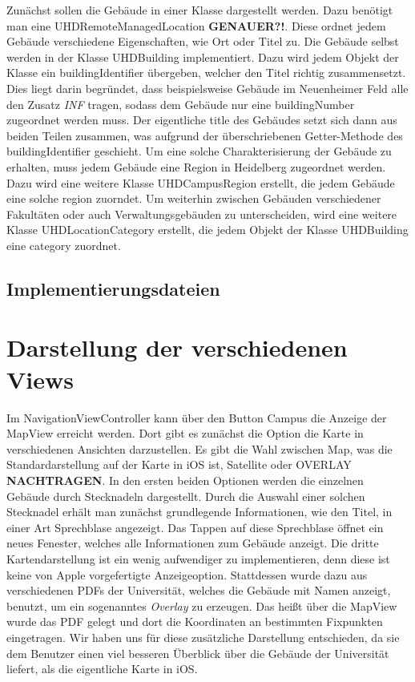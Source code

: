 \documentclass{scrreprt}
\begin{document}
Zunächst sollen die Gebäude in einer Klasse dargestellt werden. Dazu benötigt man eine \textsf{UHDRemoteManagedLocation} \textbf{GENAUER?!}. Diese ordnet jedem Gebäude verschiedene Eigenschaften, wie Ort oder Titel zu. Die Gebäude selbst werden in der Klasse \textsf{UHDBuilding} implementiert. Dazu wird jedem Objekt der Klasse ein \textsf{buildingIdentifier} übergeben, welcher den Titel richtig zusammensetzt. Dies liegt darin begründet, dass beispielsweise Gebäude im Neuenheimer Feld alle den Zusatz \emph{INF} tragen, sodass dem Gebäude nur eine \textsf{buildingNumber} zugeordnet werden muss. Der eigentliche \textsf{title} des Gebäudes setzt sich dann aus beiden Teilen zusammen, was aufgrund der überschriebenen Getter-Methode des \textsf{buildingIdentifier} geschieht. Um eine solche Charakterisierung der Gebäude zu erhalten, muss jedem Gebäude eine Region in Heidelberg zugeordnet werden. Dazu wird eine weitere Klasse \textsf{UHDCampusRegion} erstellt, die jedem Gebäude eine solche \textsf{region} zuorndet. Um weiterhin zwischen Gebäuden verschiedener Fakultäten oder auch Verwaltungsgebäuden zu unterscheiden, wird eine weitere Klasse \textsf{UHDLocationCategory} erstellt, die jedem Objekt der Klasse \textsf{UHDBuilding} eine \textsf{category} zuordnet.

\subsection{Implementierungsdateien}

\begin{objclst}

\end{objclst}


\section{Darstellung der verschiedenen Views}

Im \textsf{NavigationViewController} kann über den Button \textsf{Campus} die Anzeige der \textsf{MapView} erreicht werden. Dort gibt es zunächst die Option die Karte in verschiedenen Ansichten darzustellen. Es gibt die Wahl zwischen \textsf{Map}, was die Standardarstellung auf der Karte in iOS ist, \textsf{Satellite} oder \textsf{OVERLAY} \textbf{NACHTRAGEN}. In den ersten beiden Optionen werden die einzelnen Gebäude durch Stecknadeln dargestellt. Durch die Auswahl einer solchen Stecknadel erhält man zunächst grundlegende Informationen, wie den Titel, in einer Art Sprechblase angezeigt. Das Tappen auf diese Sprechblase öffnet ein neues Fenester, welches alle Informationen zum Gebäude anzeigt. Die dritte Kartendarstellung ist ein wenig aufwendiger zu implementieren, denn diese ist keine von Apple vorgefertigte Anzeigeoption. Stattdessen wurde dazu aus verschiedenen PDFs der Universität, welches die Gebäude mit Namen anzeigt, benutzt, um ein sogenanntes \emph{Overlay} zu erzeugen. Das heißt über die \textsf{MapView} wurde das PDF gelegt und dort die Koordinaten an bestimmten Fixpunkten eingetragen. Wir haben uns für diese zusätzliche Darstellung entschieden, da sie dem Benutzer einen viel besseren Überblick über die Gebäude der Universität liefert, als die eigentliche Karte in iOS. 
\end{document}
